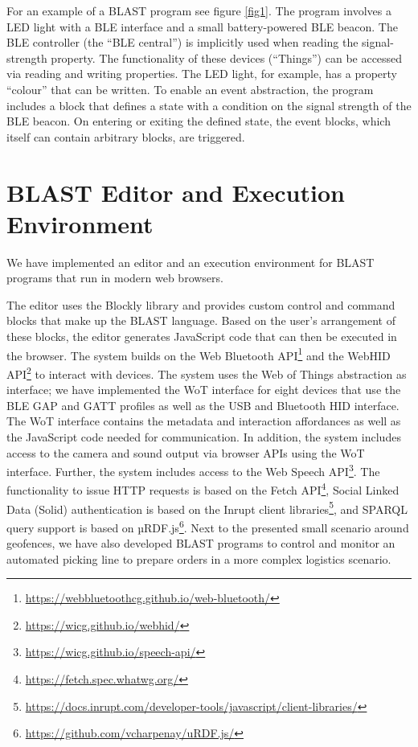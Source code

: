 \documentclass[runningheads]{llncs}
\begin{document}
For an example of a BLAST program see figure \ref{fig1}.
The program involves a LED light with a BLE interface and a small battery-powered BLE beacon.
The BLE controller (the ``BLE central'') is implicitly used when reading the signal-strength property.
The functionality of these devices (``Things'') can be accessed via reading and writing properties.
The LED light, for example, has a property ``colour'' that can be written.
To enable an event abstraction, the program includes a block that defines a state with a condition on the signal strength of the BLE beacon.
On entering or exiting the defined state, the event blocks, which itself can contain arbitrary blocks, are triggered.

\section{BLAST Editor and Execution Environment}

We have implemented an editor and an execution environment for BLAST programs that run in modern web browsers.

The editor uses the Blockly library and provides custom control and command blocks that make up the BLAST language.
Based on the user's arrangement of these blocks, the editor generates JavaScript code that can then be executed in the browser.
The system builds on the Web Bluetooth API\footnote{\url{https://webbluetoothcg.github.io/web-bluetooth/}} and the WebHID API\footnote{\url{https://wicg.github.io/webhid/}} to interact with devices.
The system uses the Web of Things abstraction as interface; we have implemented the WoT interface for eight devices that use the BLE GAP and GATT profiles as well as the USB and Bluetooth HID interface.
The WoT interface contains the metadata and interaction affordances as well as the JavaScript code needed for communication.
In addition, the system includes access to the camera and sound output via browser APIs using the WoT interface.
Further, the system includes access to the Web Speech API\footnote{\url{https://wicg.github.io/speech-api/}}.
The functionality to issue HTTP requests is based on the Fetch API\footnote{\url{https://fetch.spec.whatwg.org/}}, Social Linked Data (Solid) authentication is based on the Inrupt client libraries\footnote{\url{https://docs.inrupt.com/developer-tools/javascript/client-libraries/}}, and SPARQL query support is based on µRDF.js\footnote{\url{https://github.com/vcharpenay/uRDF.js/}}.
Next to the presented small scenario around geofences, we have also developed BLAST programs to control and monitor an automated picking line to prepare orders in a more complex logistics scenario.
\end{document}
